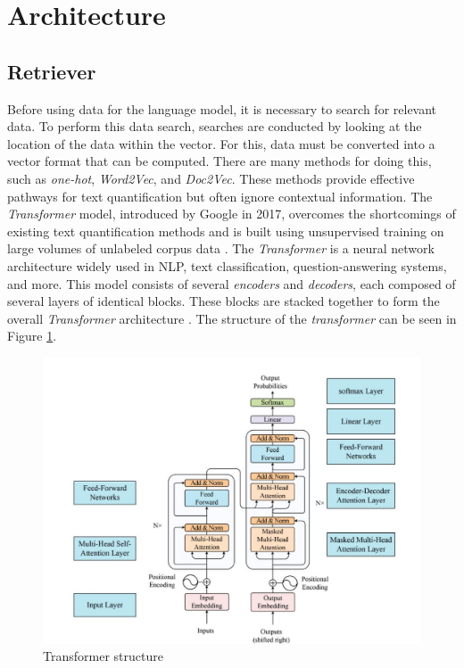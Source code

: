 \section{Architecture}
\label{sec:arsitektur}


\subsection{Retriever}
\label{subsec:Retriever}

Before using data for the language model, it is necessary to search for relevant data. To perform this data search, searches are conducted by looking at the location of the data within the vector. For this, data must be converted into a vector format that can be computed. There are many methods for doing this, such as \emph{one-hot}, \emph{Word2Vec}, and \emph{Doc2Vec}. These methods provide effective pathways for text quantification but often ignore contextual information. The \emph{Transformer} model, introduced by Google in 2017, overcomes the shortcomings of existing text quantification methods and is built using unsupervised training on large volumes of unlabeled corpus data \cite{vaswani2017attention}. The \emph{Transformer} is a neural network architecture widely used in NLP, text classification, question-answering systems, and more. This model consists of several \emph{encoders} and \emph{decoders}, each composed of several layers of identical blocks. These blocks are stacked together to form the overall \emph{Transformer} architecture \cite{miao2016processing}. The structure of the \emph{transformer} can be seen in Figure \ref*{fig:transformer}.

\begin{figure}
  \centering
  \includegraphics[width=.6\textwidth]{gambar/struktur-transformer.jpg}
  \caption{Transformer structure \cite{vaswani2017attention}}
  \label{fig:transformer}
\end{figure}

